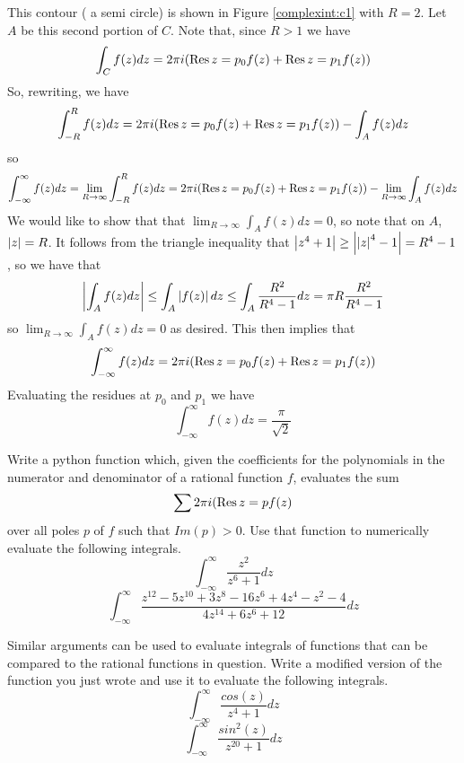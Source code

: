 This contour ( a semi circle) is shown in Figure \ref{complexint:c1} with $R = 2$.
Let $A$ be this second portion of $C$.
Note that, since $R>1$ we have
\begin{equation*}
\int_C f(z)dz = 2\pi i (\operatorname{Res}{z=p_0} f(z) +\operatorname{Res}{z=p_1} f(z))
\end{equation*}
So, rewriting, we have
\begin{equation*}
\int_{-R}^R f(z) dz = 2\pi i (\operatorname{Res}{z=p_0} f(z) +\operatorname{Res}{z=p_1} f(z)) - \int_A f(z) dz
\end{equation*}
so
\begin{equation*}
\int_{-\infty}^{\infty} f(z) dz = \lim_{R\to \infty} \int_{-R}^R f(z) dz = 2\pi i (\operatorname{Res}{z=p_0} f(z) +\operatorname{Res}{z=p_1} f(z)) - \lim_{R\to \infty} \int_A f(z) dz
\end{equation*}
We would like to show that that $\lim_{R\to\infty} \int_A f(z) dz = 0$, so note that on $A$, $\left\lvert z\right\rvert=R$.
It follows from the triangle inequality that $\left\lvert z^4+1\right\rvert\geq \left\lvert\left\lvert z\right\rvert^4-1\right\rvert = R^4 -1$, so we have that 
$$\left\lvert\int_A f(z) dz\right\rvert\leq \int_A \left\lvert f(z)\right\rvert dz \leq \int_A \frac{R^2}{R^4 -1}dz = \pi R \frac{R^2}{R^4-1}$$
so $\lim_{R\to\infty} \int_A f(z) dz = 0$ as desired.
This then implies that 
\begin{equation*}
 \int_{-\infty}^{\infty} f(z) dz = 2\pi i (\operatorname{Res}{z=p_0} f(z) +\operatorname{Res}{z=p_1} f(z))
\end{equation*}
Evaluating the residues at $p_0$ and $p_1$ we have
$$\int_{-\infty}^{\infty} f(z) dz = \frac{\pi}{\sqrt{2}}$$

\begin{problem}
Write a python function which, given the coefficients for the polynomials in the numerator and denominator of a rational function $f$, evaluates the sum
\begin{equation*}
\sum 2\pi i (\operatorname{Res}{z=p} f(z)
\end{equation*}
over all poles $p$ of $f$ such that $Im(p)>0$.
Use that function to numerically evaluate the following integrals.
$$\int_{-\infty}^{\infty} \frac{z^2}{z^6+1}dz$$
$$\int_{-\infty}^{\infty} \frac{z^{12}-5z^{10}+3z^8-16z^6+4z^4-z^2-4}{4z^{14}+6z^6+12}dz$$
\end{problem}

\begin{problem}
Similar arguments can be used to evaluate integrals of functions that can be compared to the rational functions in question.
Write a modified version of the function you just wrote and use it to evaluate the following integrals.
$$\int_{-\infty}^{\infty}\frac{cos(z)}{z^4+1}dz$$
$$\int_{-\infty}^{\infty}\frac{sin^2(z)}{z^{20}+1}dz$$
\end{problem}

